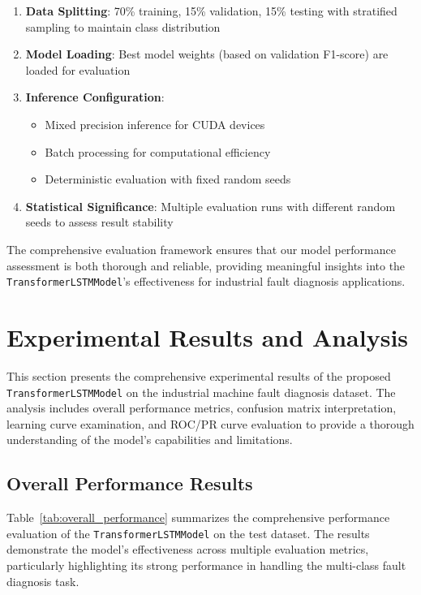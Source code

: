 \begin{enumerate}
    \item \textbf{Data Splitting}: 70\% training, 15\% validation, 15\% testing with stratified sampling to maintain class distribution
    
    \item \textbf{Model Loading}: Best model weights (based on validation F1-score) are loaded for evaluation
    
    \item \textbf{Inference Configuration}: 
    \begin{itemize}
        \item Mixed precision inference for CUDA devices
        \item Batch processing for computational efficiency
        \item Deterministic evaluation with fixed random seeds
    \end{itemize}
    
    \item \textbf{Statistical Significance}: Multiple evaluation runs with different random seeds to assess result stability
\end{enumerate}

The comprehensive evaluation framework ensures that our model performance assessment is both thorough and reliable, providing meaningful insights into the \texttt{TransformerLSTMModel}'s effectiveness for industrial fault diagnosis applications.

\section{Experimental Results and Analysis}
\label{sec:experiments:results_analysis}

This section presents the comprehensive experimental results of the proposed \texttt{TransformerLSTMModel} on the industrial machine fault diagnosis dataset. The analysis includes overall performance metrics, confusion matrix interpretation, learning curve examination, and ROC/PR curve evaluation to provide a thorough understanding of the model's capabilities and limitations.

\subsection{Overall Performance Results}
\label{subsec:overall_performance}

Table~\ref{tab:overall_performance} summarizes the comprehensive performance evaluation of the \texttt{TransformerLSTMModel} on the test dataset. The results demonstrate the model's effectiveness across multiple evaluation metrics, particularly highlighting its strong performance in handling the multi-class fault diagnosis task.

